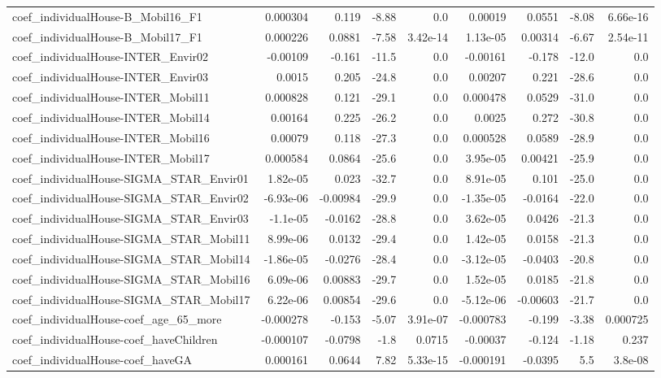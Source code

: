 \begin{tabular}{lrrrrrrrr}
coef_individualHouse-B_Mobil16_F1 & 0.000304 & 0.119 & -8.88 & 0.0 & 0.00019 & 0.0551 & -8.08 & 6.66e-16 \\
coef_individualHouse-B_Mobil17_F1 & 0.000226 & 0.0881 & -7.58 & 3.42e-14 & 1.13e-05 & 0.00314 & -6.67 & 2.54e-11 \\
coef_individualHouse-INTER_Envir02 & -0.00109 & -0.161 & -11.5 & 0.0 & -0.00161 & -0.178 & -12.0 & 0.0 \\
coef_individualHouse-INTER_Envir03 & 0.0015 & 0.205 & -24.8 & 0.0 & 0.00207 & 0.221 & -28.6 & 0.0 \\
coef_individualHouse-INTER_Mobil11 & 0.000828 & 0.121 & -29.1 & 0.0 & 0.000478 & 0.0529 & -31.0 & 0.0 \\
coef_individualHouse-INTER_Mobil14 & 0.00164 & 0.225 & -26.2 & 0.0 & 0.0025 & 0.272 & -30.8 & 0.0 \\
coef_individualHouse-INTER_Mobil16 & 0.00079 & 0.118 & -27.3 & 0.0 & 0.000528 & 0.0589 & -28.9 & 0.0 \\
coef_individualHouse-INTER_Mobil17 & 0.000584 & 0.0864 & -25.6 & 0.0 & 3.95e-05 & 0.00421 & -25.9 & 0.0 \\
coef_individualHouse-SIGMA_STAR_Envir01 & 1.82e-05 & 0.023 & -32.7 & 0.0 & 8.91e-05 & 0.101 & -25.0 & 0.0 \\
coef_individualHouse-SIGMA_STAR_Envir02 & -6.93e-06 & -0.00984 & -29.9 & 0.0 & -1.35e-05 & -0.0164 & -22.0 & 0.0 \\
coef_individualHouse-SIGMA_STAR_Envir03 & -1.1e-05 & -0.0162 & -28.8 & 0.0 & 3.62e-05 & 0.0426 & -21.3 & 0.0 \\
coef_individualHouse-SIGMA_STAR_Mobil11 & 8.99e-06 & 0.0132 & -29.4 & 0.0 & 1.42e-05 & 0.0158 & -21.3 & 0.0 \\
coef_individualHouse-SIGMA_STAR_Mobil14 & -1.86e-05 & -0.0276 & -28.4 & 0.0 & -3.12e-05 & -0.0403 & -20.8 & 0.0 \\
coef_individualHouse-SIGMA_STAR_Mobil16 & 6.09e-06 & 0.00883 & -29.7 & 0.0 & 1.52e-05 & 0.0185 & -21.8 & 0.0 \\
coef_individualHouse-SIGMA_STAR_Mobil17 & 6.22e-06 & 0.00854 & -29.6 & 0.0 & -5.12e-06 & -0.00603 & -21.7 & 0.0 \\
coef_individualHouse-coef_age_65_more & -0.000278 & -0.153 & -5.07 & 3.91e-07 & -0.000783 & -0.199 & -3.38 & 0.000725 \\
coef_individualHouse-coef_haveChildren & -0.000107 & -0.0798 & -1.8 & 0.0715 & -0.00037 & -0.124 & -1.18 & 0.237 \\
coef_individualHouse-coef_haveGA & 0.000161 & 0.0644 & 7.82 & 5.33e-15 & -0.000191 & -0.0395 & 5.5 & 3.8e-08 \\

\end{tabular}
